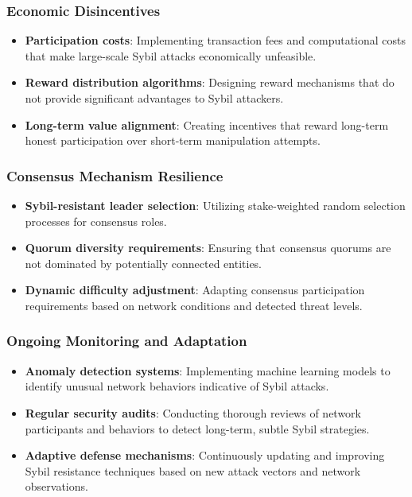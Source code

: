 \documentclass[12pt,a4paper]{article}
\begin{document}
	\subsubsection{Economic Disincentives}
	\begin{itemize}
		\item \textbf{Participation costs}: Implementing transaction fees and computational costs that make large-scale Sybil attacks economically unfeasible.
		\item \textbf{Reward distribution algorithms}: Designing reward mechanisms that do not provide significant advantages to Sybil attackers.
		\item \textbf{Long-term value alignment}: Creating incentives that reward long-term honest participation over short-term manipulation attempts.
	\end{itemize}
	
	\subsubsection{Consensus Mechanism Resilience}
	\begin{itemize}
		\item \textbf{Sybil-resistant leader selection}: Utilizing stake-weighted random selection processes for consensus roles.
		\item \textbf{Quorum diversity requirements}: Ensuring that consensus quorums are not dominated by potentially connected entities.
		\item \textbf{Dynamic difficulty adjustment}: Adapting consensus participation requirements based on network conditions and detected threat levels.
	\end{itemize}
	
	\subsubsection{Ongoing Monitoring and Adaptation}
	\begin{itemize}
		\item \textbf{Anomaly detection systems}: Implementing machine learning models to identify unusual network behaviors indicative of Sybil attacks.
		\item \textbf{Regular security audits}: Conducting thorough reviews of network participants and behaviors to detect long-term, subtle Sybil strategies.
		\item \textbf{Adaptive defense mechanisms}: Continuously updating and improving Sybil resistance techniques based on new attack vectors and network observations.
	\end{itemize}
	
\end{document}
